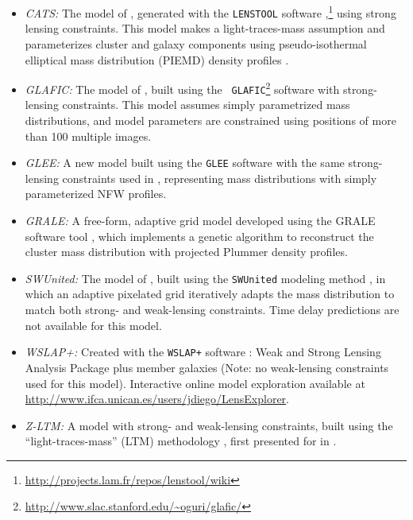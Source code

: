 \bigskip
\begin{itemize}
\item{{\it CATS:} The model of \citet{Jauzac:2014}, generated with
  the {\tt LENSTOOL} software
  \citep{Jullo:2007},\footnote{\url{http://projects.lam.fr/repos/lenstool/wiki}}}
  using strong lensing constraints.  This model makes a
  light-traces-mass assumption and parameterizes cluster and galaxy components
  using pseudo-isothermal elliptical mass distribution (PIEMD) density profiles
  \citep{Eliasdottir:2007, Limousin:2007}.
\item{\it GLAFIC:} The model of \citet{Kawamata:2016}, built using
  the {\tt
    GLAFIC}\footnote{\url{http://www.slac.stanford.edu/~oguri/glafic/}}
  software \citep{Oguri:2010b} with strong-lensing constraints. This
  model assumes simply parametrized mass distributions, and model
  parameters are constrained using positions of more than 100 multiple
  images.
\item{\it GLEE:} A new model built using the {\tt GLEE} software
  \citep{Suyu:2010b, Suyu:2012} with the same strong-lensing
  constraints used in \citet{Caminha:2017}, representing mass
  distributions with simply parameterized NFW profiles. 
\item{{\it GRALE:} A free-form, adaptive grid model developed using
  the GRALE software tool \citep{Liesenborgs:2006, Liesenborgs:2007,
    Mohammed:2014, Sebesta:2016}, which implements a genetic algorithm
  to reconstruct the cluster mass distribution with projected Plummer
  \citeyear{Plummer:1911} density profiles.}
\item{\it SWUnited:} The model of \citet{Hoag:2016}, built using the
  {\tt SWUnited} modeling method \citep{Bradac:2005, Bradac:2009}, in
  which an adaptive pixelated grid iteratively adapts the mass
  distribution to match both strong- and weak-lensing constraints.
  Time delay predictions are not available for this model.
\item{\it WSLAP+:} Created with the {\tt WSLAP+} software
  \citep{Sendra:2014}: Weak and Strong Lensing Analysis Package plus
  member galaxies (Note: no weak-lensing constraints used for this
   model). Interactive online model exploration available at
  \url{http://www.ifca.unican.es/users/jdiego/LensExplorer}.
\item{{\it Z-LTM:} A model with strong- and weak-lensing constraints,
  built using the ``light-traces-mass'' (LTM) methodology
  \citep{Zitrin:2009a,Zitrin:2015}, first presented for  in
  \citet{Zitrin:2013a}.}
\end{itemize}
\bigskip    

